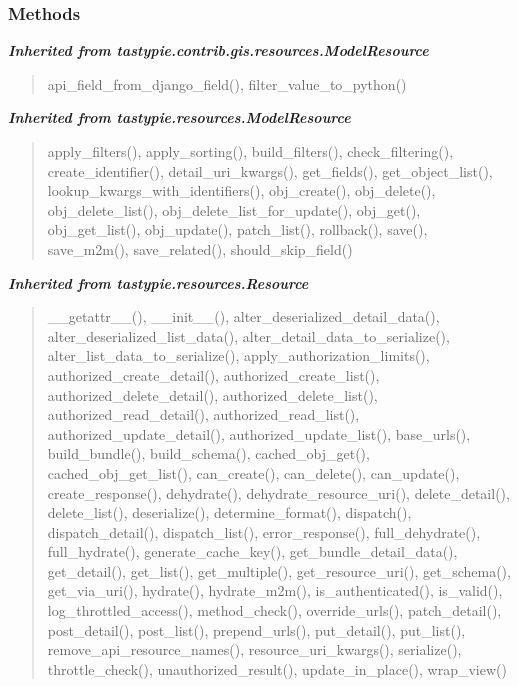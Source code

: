   \subsubsection{Methods}


\large{\textbf{\textit{Inherited from tastypie.contrib.gis.resources.ModelResource}}}

\begin{quote}
api\_field\_from\_django\_field(), filter\_value\_to\_python()
\end{quote}

\large{\textbf{\textit{Inherited from tastypie.resources.ModelResource}}}

\begin{quote}
apply\_filters(), apply\_sorting(), build\_filters(), check\_filtering(), create\_identifier(), detail\_uri\_kwargs(), get\_fields(), get\_object\_list(), lookup\_kwargs\_with\_identifiers(), obj\_create(), obj\_delete(), obj\_delete\_list(), obj\_delete\_list\_for\_update(), obj\_get(), obj\_get\_list(), obj\_update(), patch\_list(), rollback(), save(), save\_m2m(), save\_related(), should\_skip\_field()
\end{quote}

\large{\textbf{\textit{Inherited from tastypie.resources.Resource}}}

\begin{quote}
\_\_getattr\_\_(), \_\_init\_\_(), alter\_deserialized\_detail\_data(), alter\_deserialized\_list\_data(), alter\_detail\_data\_to\_serialize(), alter\_list\_data\_to\_serialize(), apply\_authorization\_limits(), authorized\_create\_detail(), authorized\_create\_list(), authorized\_delete\_detail(), authorized\_delete\_list(), authorized\_read\_detail(), authorized\_read\_list(), authorized\_update\_detail(), authorized\_update\_list(), base\_urls(), build\_bundle(), build\_schema(), cached\_obj\_get(), cached\_obj\_get\_list(), can\_create(), can\_delete(), can\_update(), create\_response(), dehydrate(), dehydrate\_resource\_uri(), delete\_detail(), delete\_list(), deserialize(), determine\_format(), dispatch(), dispatch\_detail(), dispatch\_list(), error\_response(), full\_dehydrate(), full\_hydrate(), generate\_cache\_key(), get\_bundle\_detail\_data(), get\_detail(), get\_list(), get\_multiple(), get\_resource\_uri(), get\_schema(), get\_via\_uri(), hydrate(), hydrate\_m2m(), is\_authenticated(), is\_valid(), log\_throttled\_access(), method\_check(), override\_urls(), patch\_detail(), post\_detail(), post\_list(), prepend\_urls(), put\_detail(), put\_list(), remove\_api\_resource\_names(), resource\_uri\_kwargs(), serialize(), throttle\_check(), unauthorized\_result(), update\_in\_place(), wrap\_view()
\end{quote}

